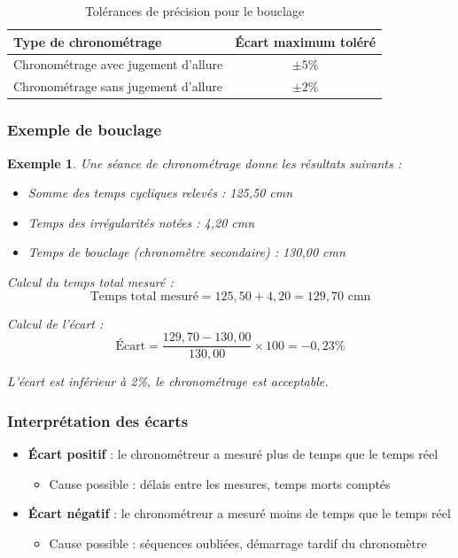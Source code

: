 \documentclass[a4paper,12pt]{article}
\newtheorem{exemple}{Exemple}[section]
\begin{document}
\begin{table}[ht]
\centering
\begin{tabular}{|l|c|}
\hline
\textbf{Type de chronométrage} & \textbf{Écart maximum toléré} \\
\hline
Chronométrage avec jugement d'allure & $\pm 5\%$ \\
Chronométrage sans jugement d'allure & $\pm 2\%$ \\
\hline
\end{tabular}
\caption{Tolérances de précision pour le bouclage}
\end{table}

\subsubsection{Exemple de bouclage}

\begin{exemple}
Une séance de chronométrage donne les résultats suivants :

\begin{itemize}
    \item Somme des temps cycliques relevés : 125,50 cmn
    \item Temps des irrégularités notées : 4,20 cmn
    \item Temps de bouclage (chronomètre secondaire) : 130,00 cmn
\end{itemize}

Calcul du temps total mesuré :
\[
\text{Temps total mesuré} = 125,50 + 4,20 = 129,70 \text{ cmn}
\]

Calcul de l'écart :
\[
\text{Écart} = \frac{129,70 - 130,00}{130,00} \times 100 = -0,23\%
\]

L'écart est inférieur à 2\%, le chronométrage est acceptable.
\end{exemple}

\subsubsection{Interprétation des écarts}

\begin{itemize}
    \item \textbf{Écart positif} : le chronométreur a mesuré plus de temps que le temps réel
    \begin{itemize}
        \item Cause possible : délais entre les mesures, temps morts comptés
    \end{itemize}
    \item \textbf{Écart négatif} : le chronométreur a mesuré moins de temps que le temps réel
    \begin{itemize}
        \item Cause possible : séquences oubliées, démarrage tardif du chronomètre
    \end{itemize}
\end{itemize}
\end{document}
